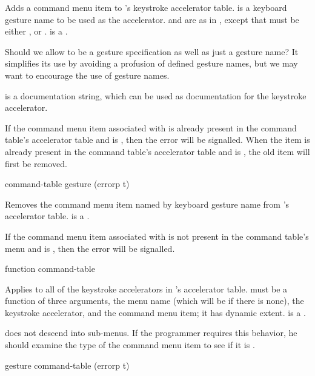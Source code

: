 Adds a command menu item to 's keystroke accelerator table.
 is a keyboard gesture name to be used as the accelerator.
 and  are as in , except
that  must be either ,  or .
 is a .

 {Should we allow  to be a gesture specification as
well as just a gesture name?  It simplifies its use by avoiding a profusion of
defined gesture names, but we may want to encourage the use of gesture names.}

 is a documentation string, which can be used as
documentation for the keystroke accelerator.

If the command menu item associated with  is already present in the
command table's accelerator table and  is , then the
 error will be signalled.  When the item is already
present in the command table's accelerator table and  is
, the old item will first be removed.


 {command-table gesture \key (errorp t)}  

Removes the command menu item named by keyboard gesture name  from
's accelerator table.   is a .

If the command menu item associated with  is not present in the
command table's menu and  is , then the
 error will be signalled.


 {function command-table}

Applies  to all of the keystroke accelerators in
's accelerator table.   must be a function of
three arguments, the menu name (which will be  if there is none), the
keystroke accelerator, and the command menu item; it has dynamic extent.
 is a .

 does not descend into sub-menus.  If the
programmer requires this behavior, he should examine the type of the command
menu item to see if it is .


 {gesture command-table \key (errorp t)}

